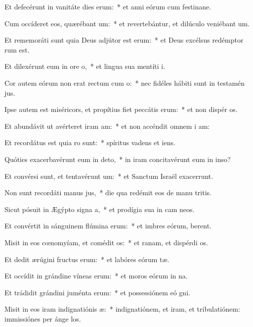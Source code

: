 \item Et defecérunt in vanitáte dies erum:~* et anni eórum cum festinane.
\item Cum occíderet eos, quærébant um:~* et revertebántur, et dilúculo veniébant  um.
\item Et rememoráti sunt quia Deus adjútor est erum:~* et Deus excélsus redémptor rum est.
\item Et dilexérunt eum in ore o,~* et lingua sua mentíti  i.
\item Cor autem eórum non erat rectum cum o:~* nec fidéles hábiti sunt in testamén jus.
\item Ipse autem est miséricors, et propítius fiet peccátis erum:~* et non dispér os.
\item Et abundávit ut avérteret iram am:~* et non accéndit omnem i am:
\item Et recordátus est quia ro sunt:~* spíritus vadens et  iens.
\item Quóties exacerbavérunt eum in deto,~* in iram concitavérunt eum in inso?
\item Et convérsi sunt, et tentavérunt um:~* et Sanctum Israël exacerrunt.
\item Non sunt recordáti manus jus,~* die qua redémit eos de manu tritis.
\item Sicut pósuit in Ægýpto signa a,~* et prodígia sua in cam neos.
\item Et convértit in sánguinem flúmina erum:~* et imbres eórum,  berent.
\item Misit in eos cœnomyíam, et comédit os:~* et ranam, et dispérdi os.
\item Et dedit ærúgini fructus erum:~* et labóres eórum tæ.
\item Et occídit in grándine víneas erum:~* et moros eórum in na.
\item Et trádidit grándini juménta erum:~* et possessiónem eó gni.
\item Misit in eos iram indignatiónis æ:~* indignatiónem, et iram, et tribulatiónem: immissiónes per ánge los.
